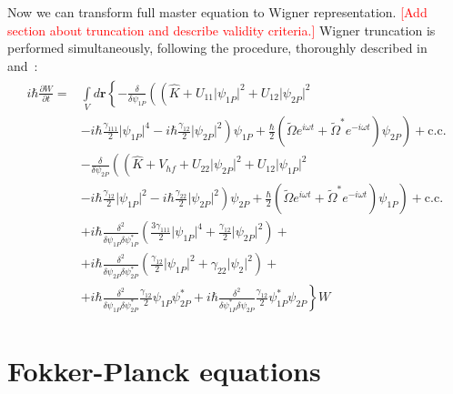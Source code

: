 \documentclass[12pt,notitlepage]{report}
\begin{document}
Now we can transform full master equation to Wigner representation.
\textcolor{red}{[Add section about truncation and describe validity criteria.]}
Wigner truncation is performed simultaneously,
following the procedure, thoroughly described in~\cite{norrie_ballagh_gardiner_2006} and~\cite{norrie_ballagh_gardiner_bradley_2006}:
\begin{align*}
\begin{split}
i \hbar \frac{\partial W}{\partial t} = & \int\limits_V d\mathbf{r} \left\{
	- \frac{\delta}{\delta \psi_{1P}} \left( \left(
		\hat{K} + U_{11} \lvert \psi_{1P} \rvert^2 + U_{12} \lvert \psi_{2P} \rvert^2 \right. \right. \right. \\
		& \left. \left. \left. - i \hbar \frac{\gamma_{111}}{2} \lvert \psi_{1P} \rvert^4 - i \hbar \frac{\gamma_{12}}{2} \lvert \psi_{2P} \rvert^2
	\right) \psi_{1P} +
	\frac{\hbar}{2} \left( \tilde{\Omega} e^{i \omega t} + \tilde{\Omega}^* e^{-i \omega t} \right) \psi_{2P} \right) +
	\textrm{c.c.} \right. \\
& \left. - \frac{\delta}{\delta \psi_{2P}} \left( \left(
		\hat{K} + V_{hf} + U_{22} \lvert \psi_{2P} \rvert^2 + U_{12} \lvert \psi_{1P} \rvert^2 \right. \right. \right. \\
		& \left. \left. \left. - i \hbar \frac{\gamma_{12}}{2} \lvert \psi_{1P} \rvert^2 - i \hbar \frac{\gamma_{22}}{2} \lvert \psi_{2P} \rvert^2
	\right) \psi_{2P} +
	\frac{\hbar}{2} \left( \tilde{\Omega} e^{i \omega t} + \tilde{\Omega}^* e^{-i \omega t} \right) \psi_{1P} \right) +
	\textrm{c.c.} \right. \\
& \left. + i \hbar \frac{\delta^2}{\delta \psi_{1P} \delta \psi_{1P}^*} \left(
	\frac{3 \gamma_{111}}{2} \lvert \psi_{1P} \rvert^4 + \frac{\gamma_{12}}{2} \lvert \psi_{2P} \rvert^2
\right) + \right. \\
& \left. + i \hbar \frac{\delta^2}{\delta \psi_{2P} \delta \psi_{2P}^*} \left(
	\frac{\gamma_{12}}{2} \lvert \psi_{1P} \rvert^2 + \gamma_{22} \lvert \psi_2 \rvert^2
\right) + \right. \\
& \left. + i \hbar \frac{\delta^2}{\delta \psi_{1P} \delta \psi_{2P}^*} \frac{\gamma_{12}}{2} \psi_{1P} \psi_{2P}^*
+ i \hbar \frac{\delta^2}{\delta \psi_{1P}^* \delta \psi_{2P}} \frac{\gamma_{12}}{2} \psi_{1P}^* \psi_{2P}
\right\} W
\end{split}
\end{align*}

\section{Fokker-Planck equations}
\end{document}
